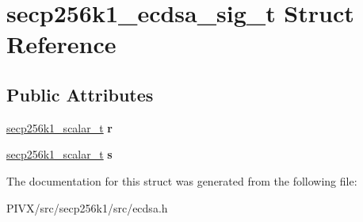 \hypertarget{structsecp256k1__ecdsa__sig__t}{}\section{secp256k1\+\_\+ecdsa\+\_\+sig\+\_\+t Struct Reference}
\label{structsecp256k1__ecdsa__sig__t}
\subsection*{Public Attributes}
\begin{DoxyCompactItemize}
\item 
\mbox{\label{structsecp256k1__ecdsa__sig__t_a32b6d48a55e5d6b28384839041050315}} 
\mbox{\hyperlink{structsecp256k1__scalar__t}{secp256k1\+\_\+scalar\+\_\+t}} {\bfseries r}
\item 
\mbox{\label{structsecp256k1__ecdsa__sig__t_a0f0890ac90c2d0438b578ee92fc9c3b6}} 
\mbox{\hyperlink{structsecp256k1__scalar__t}{secp256k1\+\_\+scalar\+\_\+t}} {\bfseries s}
\end{DoxyCompactItemize}


The documentation for this struct was generated from the following file\+:\begin{DoxyCompactItemize}
\item 
P\+I\+V\+X/src/secp256k1/src/ecdsa.\+h\end{DoxyCompactItemize}
